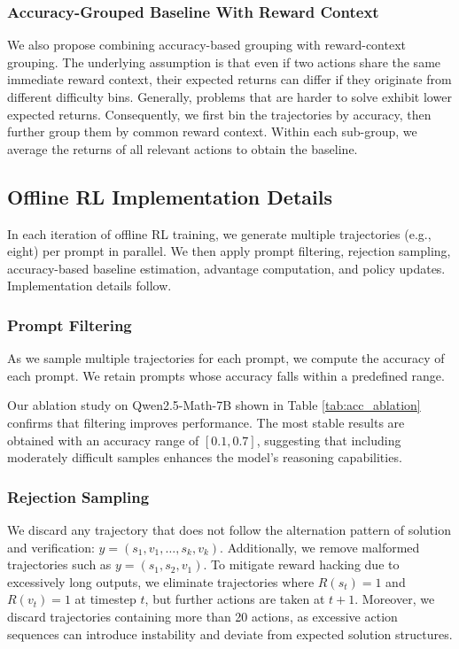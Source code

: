 \subsubsection{Accuracy-Grouped Baseline With Reward Context}
We also propose combining accuracy-based grouping with reward-context grouping. The underlying assumption is that even if two actions share the same immediate reward context, their expected returns can differ if they originate from different difficulty bins. Generally, problems that are harder to solve exhibit lower expected returns. Consequently, we first bin the trajectories by accuracy, then further group them by common reward context. Within each sub-group, we average the returns of all relevant actions to obtain the baseline.

\subsection{Offline RL Implementation Details}
\label{ap:offline_rl_details}
In each iteration of offline RL training, we generate multiple trajectories (e.g., eight) per prompt in parallel. We then apply prompt filtering, rejection sampling, accuracy-based baseline estimation, advantage computation, and policy updates. Implementation details follow.

\subsubsection{Prompt Filtering}

As we sample multiple trajectories for each prompt, we compute the accuracy of each prompt. We retain prompts whose accuracy falls within a predefined range.

Our ablation study on Qwen2.5-Math-7B shown in Table \ref{tab:acc_ablation} confirms that filtering improves performance. The most stable results are obtained with an accuracy range of \([0.1,0.7]\), suggesting that including moderately difficult samples enhances the model's reasoning capabilities.

\subsubsection{Rejection Sampling}
We discard any trajectory that does not follow the alternation pattern of solution and verification:
$y = (s_1, v_1, \dots, s_k, v_k)$.
Additionally, we remove malformed trajectories such as $y = (s_1, s_2, v_1)$. To mitigate reward hacking due to excessively long outputs, we eliminate trajectories where $R(s_t) = 1$ and $R(v_t) = 1$ at timestep $t$, but further actions are taken at $t+1$. Moreover, we discard trajectories containing more than 20 actions, as excessive action sequences can introduce instability and deviate from expected solution structures.

